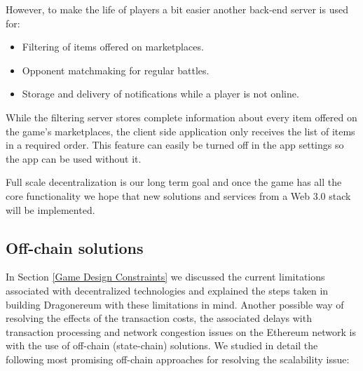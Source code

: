 \documentclass[12pt]{article}
\begin{document}
\begin{samepage}
However, to make the life of players a bit easier another back-end server is used for:\par

\begin{itemize}
	\item Filtering of items offered on marketplaces.\par

	\item Opponent matchmaking for regular battles.\par

	\item Storage and delivery of notifications while a player is not online.
\end{itemize}\par
\end{samepage}

While the filtering server stores complete information about every item offered on the game’s marketplaces, the client side application only receives the list of items in a required order. This feature can easily be turned off in the app settings so the app can be used without it.\par

Full scale decentralization is our long term goal and once the game has all the core functionality we hope that new solutions and services from a Web 3.0 stack will be implemented.




\vspace{\baselineskip}\subsection{Off-chain solutions}
 \label{Off-chain solutions} \par

In Section \ref{Game Design Constraints} we discussed the current limitations associated with decentralized technologies and explained the steps taken in building Dragonereum with these limitations in mind. Another possible way of resolving the effects of the transaction costs, the associated delays with transaction processing and network congestion issues on the Ethereum network is with the use of off-chain (state-chain) solutions. We studied in detail the following most promising off-chain approaches for resolving the scalability issue:\par
\end{document}
